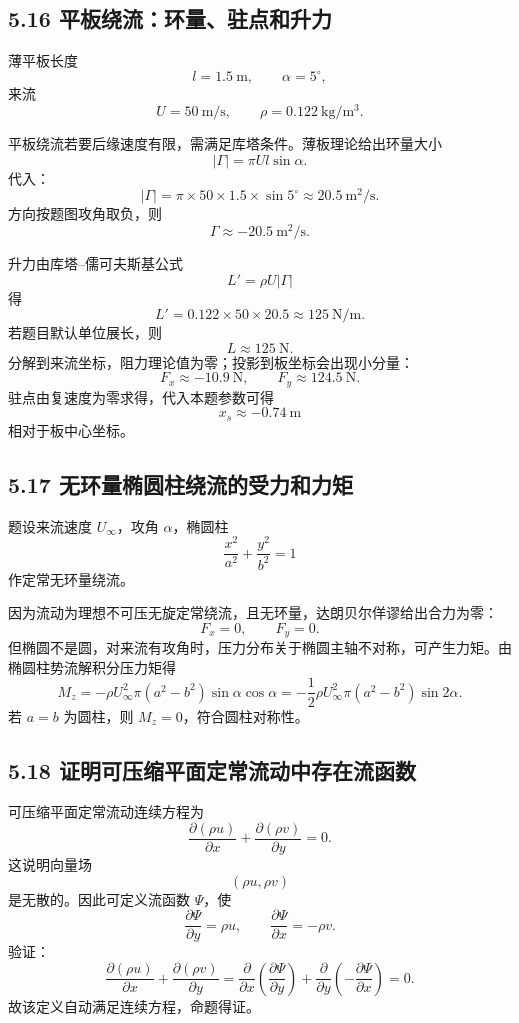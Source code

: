 \documentclass[UTF8,zihao=-4]{ctexart}
\begin{document}
\subsection*{5.16 平板绕流：环量、驻点和升力}

薄平板长度
\[
l=1.5\ \mathrm m,\qquad \alpha=5^\circ,
\]
来流
\[
U=50\ \mathrm{m/s},\qquad \rho=0.122\ \mathrm{kg/m^3}.
\]

平板绕流若要后缘速度有限，需满足库塔条件。薄板理论给出环量大小
\[
|\Gamma|=\pi U l\sin\alpha .
\]
代入：
\[
|\Gamma|=\pi\times50\times1.5\times\sin5^\circ
\approx20.5\ \mathrm{m^2/s}.
\]
方向按题图攻角取负，则
\[
\boxed{\Gamma\approx-20.5\ \mathrm{m^2/s}.}
\]

升力由库塔--儒可夫斯基公式
\[
L'=\rho U|\Gamma|
\]
得
\[
L'=0.122\times50\times20.5
\approx125\ \mathrm{N/m}.
\]
若题目默认单位展长，则
\[
\boxed{L\approx125\ \mathrm N.}
\]
分解到来流坐标，阻力理论值为零；投影到板坐标会出现小分量：
\[
F_x\approx-10.9\ \mathrm N,\qquad F_y\approx124.5\ \mathrm N .
\]
驻点由复速度为零求得，代入本题参数可得
\[
\boxed{x_s\approx-0.74\ \mathrm m}
\]
相对于板中心坐标。

\subsection*{5.17 无环量椭圆柱绕流的受力和力矩}

题设来流速度 \(U_\infty\)，攻角 \(\alpha\)，椭圆柱
\[
\frac{x^2}{a^2}+\frac{y^2}{b^2}=1
\]
作定常无环量绕流。

因为流动为理想不可压无旋定常绕流，且无环量，达朗贝尔佯谬给出合力为零：
\[
\boxed{F_x=0,\qquad F_y=0.}
\]
但椭圆不是圆，对来流有攻角时，压力分布关于椭圆主轴不对称，可产生力矩。由椭圆柱势流解积分压力矩得
\[
\boxed{
M_z=-\rho U_\infty^2\pi(a^2-b^2)\sin\alpha\cos\alpha
=-\frac12\rho U_\infty^2\pi(a^2-b^2)\sin2\alpha .}
\]
若 \(a=b\) 为圆柱，则 \(M_z=0\)，符合圆柱对称性。

\subsection*{5.18 证明可压缩平面定常流动中存在流函数}

可压缩平面定常流动连续方程为
\[
\frac{\partial(\rho u)}{\partial x}
+\frac{\partial(\rho v)}{\partial y}=0 .
\]
这说明向量场
\[
(\rho u,\rho v)
\]
是无散的。因此可定义流函数 \(\Psi\)，使
\[
\boxed{
\frac{\partial\Psi}{\partial y}=\rho u,\qquad
\frac{\partial\Psi}{\partial x}=-\rho v.}
\]
验证：
\[
\frac{\partial(\rho u)}{\partial x}
+\frac{\partial(\rho v)}{\partial y}
=
\frac{\partial}{\partial x}\left(\frac{\partial\Psi}{\partial y}\right)
+\frac{\partial}{\partial y}\left(-\frac{\partial\Psi}{\partial x}\right)
=0.
\]
故该定义自动满足连续方程，命题得证。
\end{document}
